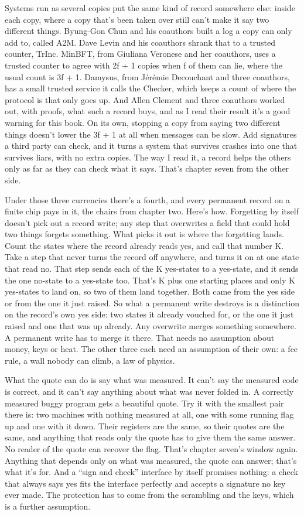 \documentclass[11pt,twoside]{article}
\theoremstyle{thielethm}
\theoremstyle{thieledef}
\theoremstyle{thieledef}
\theoremstyle{thieledef}
\theoremstyle{thielethm}
\theoremstyle{thieleobs}
\theoremstyle{thielethm}
\begin{document}
Systems run as several copies put the same kind of record somewhere else: inside each copy, where a copy that's been taken over still can't make it say two different things. Byung-Gon Chun and his coauthors built a log a copy can only add to, called A2M. Dave Levin and his coauthors shrank that to a trusted counter, TrInc. MinBFT, from Giuliana Veronese and her coauthors, uses a trusted counter to agree with 2f + 1 copies when f of them can lie, where the usual count is 3f + 1. Damysus, from Jérémie Decouchant and three coauthors, has a small trusted service it calls the Checker, which keeps a count of where the protocol is that only goes up. And Allen Clement and three coauthors worked out, with proofs, what such a record buys, and as I read their result it's a good warning for this book. On its own, stopping a copy from saying two different things doesn't lower the 3f + 1 at all when messages can be slow. Add signatures a third party can check, and it turns a system that survives crashes into one that survives liars, with no extra copies. The way I read it, a record helps the others only as far as they can check what it says. That's chapter seven from the other side.

Under those three currencies there's a fourth, and every permanent record on a finite chip pays in it, the chairs from chapter two. Here's how. Forgetting by itself doesn't pick out a record write; any step that overwrites a field that could hold two things forgets something. What picks it out is where the forgetting lands. Count the states where the record already reads yes, and call that number K. Take a step that never turns the record off anywhere, and turns it on at one state that read no. That step sends each of the K yes-states to a yes-state, and it sends the one no-state to a yes-state too. That's K plus one starting places and only K yes-states to land on, so two of them land together. Both came from the yes side or from the one it just raised. So what a permanent write destroys is a distinction on the record's own yes side: two states it already vouched for, or the one it just raised and one that was up already. Any overwrite merges something somewhere. A permanent write has to merge it there. That needs no assumption about money, keys or heat. The other three each need an assumption of their own: a fee rule, a wall nobody can climb, a law of physics.

What the quote can do is say what was measured. It can't say the measured code is correct, and it can't say anything about what was never folded in. A correctly measured buggy program gets a beautiful quote. Try it with the smallest pair there is: two machines with nothing measured at all, one with some running flag up and one with it down. Their registers are the same, so their quotes are the same, and anything that reads only the quote has to give them the same answer. No reader of the quote can recover the flag. That's chapter seven's window again. Anything that depends only on what was measured, the quote can answer; that's what it's for. And a ``sign and check'' interface by itself promises nothing: a check that always says yes fits the interface perfectly and accepts a signature no key ever made. The protection has to come from the scrambling and the keys, which is a further assumption.
\end{document}
